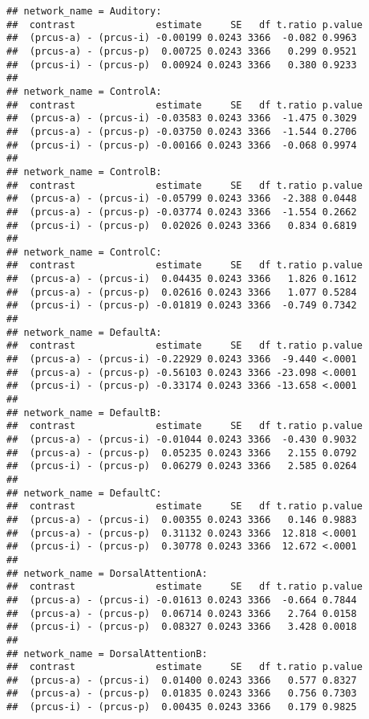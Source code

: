 \documentclass[
]{article}
\begin{document}
\begin{verbatim}
## network_name = Auditory:
##  contrast              estimate     SE   df t.ratio p.value
##  (prcus-a) - (prcus-i) -0.00199 0.0243 3366  -0.082 0.9963 
##  (prcus-a) - (prcus-p)  0.00725 0.0243 3366   0.299 0.9521 
##  (prcus-i) - (prcus-p)  0.00924 0.0243 3366   0.380 0.9233 
## 
## network_name = ControlA:
##  contrast              estimate     SE   df t.ratio p.value
##  (prcus-a) - (prcus-i) -0.03583 0.0243 3366  -1.475 0.3029 
##  (prcus-a) - (prcus-p) -0.03750 0.0243 3366  -1.544 0.2706 
##  (prcus-i) - (prcus-p) -0.00166 0.0243 3366  -0.068 0.9974 
## 
## network_name = ControlB:
##  contrast              estimate     SE   df t.ratio p.value
##  (prcus-a) - (prcus-i) -0.05799 0.0243 3366  -2.388 0.0448 
##  (prcus-a) - (prcus-p) -0.03774 0.0243 3366  -1.554 0.2662 
##  (prcus-i) - (prcus-p)  0.02026 0.0243 3366   0.834 0.6819 
## 
## network_name = ControlC:
##  contrast              estimate     SE   df t.ratio p.value
##  (prcus-a) - (prcus-i)  0.04435 0.0243 3366   1.826 0.1612 
##  (prcus-a) - (prcus-p)  0.02616 0.0243 3366   1.077 0.5284 
##  (prcus-i) - (prcus-p) -0.01819 0.0243 3366  -0.749 0.7342 
## 
## network_name = DefaultA:
##  contrast              estimate     SE   df t.ratio p.value
##  (prcus-a) - (prcus-i) -0.22929 0.0243 3366  -9.440 <.0001 
##  (prcus-a) - (prcus-p) -0.56103 0.0243 3366 -23.098 <.0001 
##  (prcus-i) - (prcus-p) -0.33174 0.0243 3366 -13.658 <.0001 
## 
## network_name = DefaultB:
##  contrast              estimate     SE   df t.ratio p.value
##  (prcus-a) - (prcus-i) -0.01044 0.0243 3366  -0.430 0.9032 
##  (prcus-a) - (prcus-p)  0.05235 0.0243 3366   2.155 0.0792 
##  (prcus-i) - (prcus-p)  0.06279 0.0243 3366   2.585 0.0264 
## 
## network_name = DefaultC:
##  contrast              estimate     SE   df t.ratio p.value
##  (prcus-a) - (prcus-i)  0.00355 0.0243 3366   0.146 0.9883 
##  (prcus-a) - (prcus-p)  0.31132 0.0243 3366  12.818 <.0001 
##  (prcus-i) - (prcus-p)  0.30778 0.0243 3366  12.672 <.0001 
## 
## network_name = DorsalAttentionA:
##  contrast              estimate     SE   df t.ratio p.value
##  (prcus-a) - (prcus-i) -0.01613 0.0243 3366  -0.664 0.7844 
##  (prcus-a) - (prcus-p)  0.06714 0.0243 3366   2.764 0.0158 
##  (prcus-i) - (prcus-p)  0.08327 0.0243 3366   3.428 0.0018 
## 
## network_name = DorsalAttentionB:
##  contrast              estimate     SE   df t.ratio p.value
##  (prcus-a) - (prcus-i)  0.01400 0.0243 3366   0.577 0.8327 
##  (prcus-a) - (prcus-p)  0.01835 0.0243 3366   0.756 0.7303 
##  (prcus-i) - (prcus-p)  0.00435 0.0243 3366   0.179 0.9825 

\end{verbatim}
\end{document}
